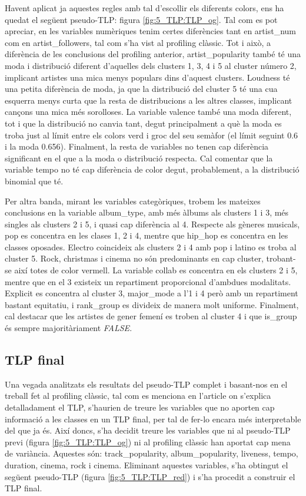 Havent aplicat ja aquestes regles amb tal d'escollir els diferents colors, ens ha quedat el següent pseudo-TLP: figura \ref{fig:5_TLP:TLP_og}. Tal com es pot apreciar, en les variables numèriques tenim certes diferències tant en artist\_num com en artist\_followers, tal com s'ha vist al profiling clàssic. Tot i això, a diferència de les conclusions del profiling anterior, artist\_popularity també té una moda i distribució diferent d'aquelles dels clusters 1, 3, 4 i 5 al cluster número 2, implicant artistes una mica menys populars dins d'aquest clusters. Loudness té una petita diferència de moda, ja que la distribució del cluster 5 té una cua esquerra menys curta que la resta de distribucions a les altres classes, implicant cançons una mica més sorolloses. La variable valence també una moda diferent, tot i que la distribució no canvia tant, degut principalment a què la moda es troba just al límit entre els colors verd i groc del seu semàfor (el límit seguint 0.6 i la moda 0.656). Finalment, la resta de variables no tenen cap diferència significant en el que a la moda o distribució respecta. Cal comentar que la variable tempo no té cap diferència de color degut, probablement, a la distribució binomial que té.

Per altra banda, mirant les variables categòriques, trobem les mateixes conclusions en la variable album\_type, amb més àlbums als clusters 1 i 3, més singles als clusters 2 i 5, i quasi cap diferència al 4. Respecte als gèneres musicals, pop es concentra en les clases 1, 2 i 4, mentre que hip\_hop es concentra en les classes oposades. Electro coincideix als clusters 2 i 4 amb pop i latino es troba al cluster 5. Rock, christmas i cinema no són predominants en cap cluster, trobant-se així totes de color vermell. La variable collab es concentra en els clusters 2 i 5, mentre que en el 3 existeix un repartiment proporcional d'ambdues modalitats. Explicit es concentra al cluster 3, major\_mode a l'1 i 4 però amb un repartiment bastant equitatiu, i rank\_group es divideix de manera molt uniforme. Finalment, cal destacar que les artistes de gener femení es troben al cluster 4 i que is\_group és sempre majoritàriament \textit{FALSE}.

\subsection{TLP final}

Una vegada analitzats els resultats del pseudo-TLP complet i basant-nos en el treball fet al profiling clàssic, tal com es menciona en l'article on s'explica detalladament el TLP, s'haurien de treure les variables que no aporten cap informació a les classes en un TLP final, per tal de fer-lo encara més interpretable del que ja és. Així doncs, s'ha decidit treure les variables que ni al pseudo-TLP previ (figura \ref{fig:5_TLP:TLP_og}) ni al profiling clàssic han aportat cap mena de variància. Aquestes són: track\_popularity, album\_popularity, liveness, tempo, duration, cinema, rock i cinema. Eliminant aquestes variables, s'ha obtingut el següent pseudo-TLP (figura \ref{fig:5_TLP:TLP_red}) i s'ha procedit a construir el TLP final.

